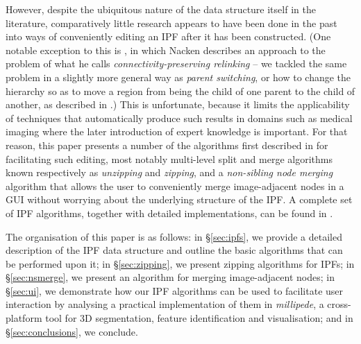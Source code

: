 \documentclass[10pt,twocolumn,twoside]{IEEEtran}
\begin{document}

However, despite the ubiquitous nature of the data structure itself in the literature, comparatively little research appears to have been done in the past into ways of conveniently editing an IPF after it has been constructed. (One notable exception to this is \cite{nacken95}, in which Nacken describes an approach to the problem of what he calls \emph{connectivity-preserving relinking} -- we tackled the same problem in a slightly more general way as \emph{parent switching}, or how to change the hierarchy so as to move a region from being the child of one parent to the child of another, as described in \cite{golodetz11}.) This is unfortunate, because it limits the applicability of techniques that automatically produce such results in domains such as medical imaging where the later introduction of expert knowledge is important. For that reason, this paper presents a number of the algorithms first described in \cite{golodetz11} for facilitating such editing, most notably multi-level split and merge algorithms known respectively as \emph{unzipping} and \emph{zipping}, and a \emph{non-sibling node merging} algorithm that allows the user to conveniently merge image-adjacent nodes in a GUI without worrying about the underlying structure of the IPF. A complete set of IPF algorithms, together with detailed implementations, can be found in \cite{golodetz11}.

The organisation of this paper is as follows: in \S\ref{sec:ipfs}, we provide a detailed description of the IPF data structure and outline the basic algorithms that can be performed upon it; in \S\ref{sec:zipping}, we present zipping algorithms for IPFs; in \S\ref{sec:nsmerge}, we present an algorithm for merging image-adjacent nodes; in \S\ref{sec:ui}, we demonstrate how our IPF algorithms can be used to facilitate user interaction by analysing a practical implementation of them in \emph{millipede}, a cross-platform tool for 3D segmentation, feature identification and visualisation; and in \S\ref{sec:conclusions}, we conclude.

\end{document}
